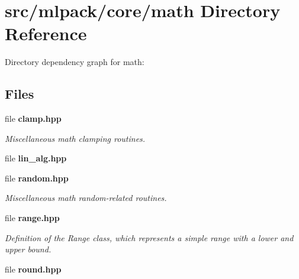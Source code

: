 \section{src/mlpack/core/math Directory Reference}
\label{dir_9ad81086302dc6a18a7fe6365a98af87}
Directory dependency graph for math\-:
\subsection*{Files}
\begin{DoxyCompactItemize}
\item 
file {\bf clamp.\-hpp}
\begin{DoxyCompactList}\small\item\em Miscellaneous math clamping routines. \end{DoxyCompactList}\item 
file {\bf lin\-\_\-alg.\-hpp}
\item 
file {\bf random.\-hpp}
\begin{DoxyCompactList}\small\item\em Miscellaneous math random-\/related routines. \end{DoxyCompactList}\item 
file {\bf range.\-hpp}
\begin{DoxyCompactList}\small\item\em Definition of the Range class, which represents a simple range with a lower and upper bound. \end{DoxyCompactList}\item 
file {\bf round.\-hpp}
\end{DoxyCompactItemize}
